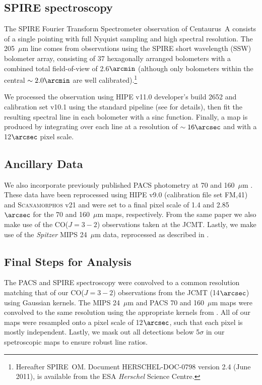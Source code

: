 \documentclass[preprint2]{aastex}
\begin{document}
\subsection{SPIRE spectroscopy}\label{spire_spec}
The SPIRE Fourier Transform Spectrometer observation of Centaurus~A consists of a single pointing with full Nyquist sampling and high spectral resolution.  The 205~$\mu$m line comes from observations using the SPIRE short wavelength (SSW) bolometer array, consisting of 37 hexagonally arranged bolometers with a combined total field-of-view of 2.6$\arcmin$ (although only bolometers within the central $\sim 2.0\arcmin$ are well calibrated).\footnote{Hereafter SPIRE~OM.  Document HERSCHEL-DOC-0798 version 2.4 (June 2011), is available from the ESA \emph{Herschel} Science Centre.}

We processed the observation using HIPE v11.0 developer's build 2652 and calibration set v10.1 using the standard pipeline (see \citet{parkin_2013} for details), then fit the resulting spectral line in each bolometer with a sinc function.  Finally, a map is produced by integrating over each line at a resolution of $\sim 16\arcsec$ and with a 12$\arcsec$ pixel scale.

\subsection{Ancillary Data}
We also incorporate previously published PACS photometry at 70 and 160~$\mu$m \citep{2012MNRAS.422.2291P}.  These data have been reprocessed using HIPE v9.0 (calibration file set FM,41) and \textsc{Scanamorphos} v21 and were set to a final pixel scale of 1.4 and 2.85~$\arcsec$ for the 70 and 160~$\mu$m maps, respectively.  From the same paper we also make use of the CO($J=3-2$) observations taken at the JCMT.  Lastly, we make use of the \emph{Spitzer} MIPS 24~$\mu$m data, reprocessed as described in \citep{2012MNRAS.423..197B}.

\subsection{Final Steps for Analysis}\label{prep_analysis}
The PACS and SPIRE spectroscopy were convolved to a common resolution matching that of our CO($J = 3-2$) observations from the JCMT (14$\arcsec$) using Gaussian kernels.  The MIPS 24~$\mu$m and PACS 70 and 160~$\mu$m maps were convolved to the same resolution using the appropriate kernels from \citet{2011PASP..123.1218A}.  All of our maps were resampled onto a pixel scale of 12$\arcsec$, such that each pixel is mostly independent.  Lastly, we mask out all detections below 5$\sigma$ in our spetroscopic maps to ensure robust line ratios.
\end{document}
